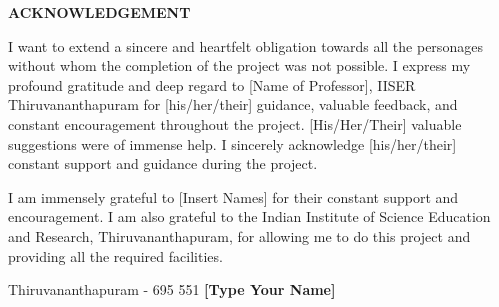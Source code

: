 \begin{center}
{\large{\bf{ACKNOWLEDGEMENT}}}
\end{center}


 I want to extend a sincere and heartfelt obligation towards all the personages without whom the completion of the project was not possible. I express my profound gratitude and deep regard to [Name of Professor], IISER Thiruvananthapuram for [his/her/their] guidance, valuable feedback, and constant encouragement throughout the project. [His/Her/Their] valuable suggestions were of immense help. I sincerely acknowledge [his/her/their] constant support and guidance during the project. 

I am immensely grateful to [Insert Names] for their constant support and encouragement. I am also grateful to the Indian Institute of Science Education and Research, Thiruvananthapuram, for allowing me to do this project and providing all the required facilities.




\vspace{4cm} %

\noindent Thiruvananthapuram - 695 551 \hfill \textbf{[Type Your Name]}

 \hfill

\clearpage